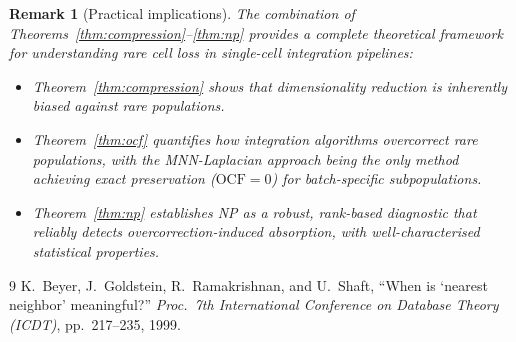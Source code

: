 \documentclass[11pt]{article}
\newtheorem{remark}[theorem]{Remark}
\begin{document}
\begin{remark}[Practical implications]
The combination of Theorems~\ref{thm:compression}--\ref{thm:np} provides
a complete theoretical framework for understanding rare cell loss in
single-cell integration pipelines:
\begin{itemize}
    \item Theorem~\ref{thm:compression} shows that dimensionality reduction
    is inherently biased against rare populations.
    \item Theorem~\ref{thm:ocf} quantifies how integration algorithms
    overcorrect rare populations, with the MNN-Laplacian approach being
    the only method achieving exact preservation ($\mathrm{OCF} = 0$)
    for batch-specific subpopulations.
    \item Theorem~\ref{thm:np} establishes NP as a robust, rank-based
    diagnostic that reliably detects overcorrection-induced absorption,
    with well-characterised statistical properties.
\end{itemize}
\end{remark}

\begin{thebibliography}{9}
K.~Beyer, J.~Goldstein, R.~Ramakrishnan, and U.~Shaft,
``When is `nearest neighbor' meaningful?''
\textit{Proc.\ 7th International Conference on Database Theory (ICDT)},
pp.~217--235, 1999.
\end{thebibliography}
\end{document}

